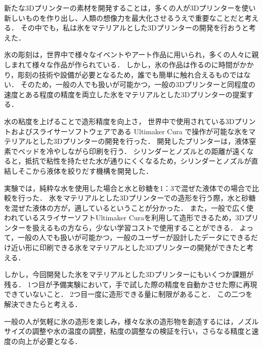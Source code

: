 新たな3Dプリンターの素材を開発することは，多くの人が3Dプリンターを使い新しいものを作り出し、人類の想像力を最大化させるうえで重要なことだと考える．
その中でも，私は氷をマテリアルとした3Dプリンターの開発を行おうと考えた．

氷の彫刻は，世界中で様々なイベントやアート作品に用いられ，多くの人々に親しまれて様々な作品が作られている．
しかし，氷の作品は作るのに時間がかかり，彫刻の技術や設備が必要となるため，誰でも簡単に触れ合えるものではない．
そのため，一般の人でも扱いが可能かつ，一般の3Dプリンターと同程度の速度とある程度の精度を両立した氷をマテリアルとした3Dプリンターの提案する．

水の粘度を上げることで造形精度を向上さ，
世界中で使用されている3Dプリントおよびスライサーソフトウェアである Ultimaker Cura で操作が可能な氷をマテリアルとした3Dプリンターの開発を行った．
開発したプリンターは，液体窒素でベッドを冷やしながら印刷を行う．
シリンダーとノズルとの距離が遠くなると，抵抗で粘性を持たせた水が通りにくくなるため，シリンダーとノズルが直結しそこから液体を絞りだす機構を開発した．


実験では，純粋な水を使用した場合と水と砂糖を1：3で混ぜた液体での場合で比較を行った．
氷をマテリアルとした3Dプリンターでの造形を行う際，水と砂糖を混ぜた液体の方が，適しているということが分かった．
また，一般で広く使われているスライサーソフトUltimaker Curaを利用して造形できるため，3Dプリンターを扱えるもの方なら，少ない学習コストで使用することができる．
よって，一般の人でも扱いが可能かつ，一般のユーザーが設計したデータにできるだけ近い形に印刷できる氷をマテリアルとした3Dプリンターの開発ができたと考える．

しかし，今回開発した氷をマテリアルとした3Dプリンターにもいくつか課題が残る．
1つ目が予備実験において，手で試した際の精度を自動かさせた際に再現できていないこと．
2つ目一度に造形できる量に制限があること．
この二つを解決できたらと考える．

一般の人が気軽に氷の造形を楽しみ，様々な氷の造形物を創造するには，ノズルサイズの調整や水の温度の調整，粘度の調整なの検証を行い，さらなる精度と速度の向上が必要となる．



